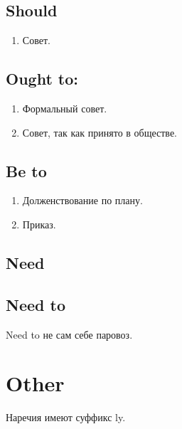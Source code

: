 \documentclass[oneside]{book}
\begin{document}
\section{Should}
\begin{enumerate}
    \item Совет.
\end{enumerate}

\section{Ought to:}
\begin{enumerate}
    \item Формальный совет.
    \item Совет, так как принято в обществе.
\end{enumerate}

\section{Be to}
\begin{enumerate}
    \item Долженствование по плану.
    \item Приказ.
\end{enumerate}

\section{Need}

\section{Need to}
Need to не сам себе паровоз.

\chapter{Other}
Наречия имеют суффикс ly.
\end{document}
